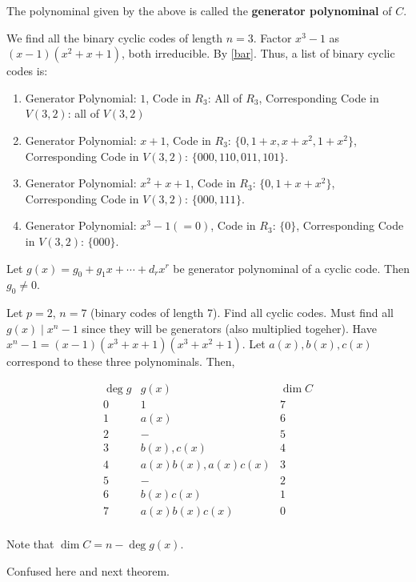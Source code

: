 \documentclass{article}
\begin{document}
\begin{definition}
  The polynominal given by the above is called the \textbf{generator
  polynominal} of \( C \).
\end{definition}
\begin{example}
  We find all the binary cyclic codes of length \( n=3 \). Factor \( x^3-1 \) as \( (x-1)(x^2+x+1) \), both irreducible. By \autoref{bar}. Thus, a list of binary cyclic codes is:
  \begin{enumerate}
    \item Generator Polynomial: \( 1 \), Code in  \( R_3 \): All of \( R_3 \), Corresponding Code in \( V(3, 2) \): all of \( V(3, 2) \)
    \item Generator Polynomial: \( x+1 \), Code in \( R_3 \): \( \{0, 1+x, x+x^2, 1+x^2 \}\), Corresponding Code in \( V(3, 2) \): \( \{000, 110, 011, 101\} \).
    \item Generator Polynomial: \( x^2+x+1 \), Code in \( R_3 \): \( \{0, 1+x+x^2\}\), Corresponding Code in \( V(3, 2) \): \( \{000, 111\} \).
    \item Generator Polynomial: \( x^3-1 (=0) \), Code in \( R_3 \): \( \{0\} \), Corresponding Code in \( V(3, 2) \): \( \{000\} \).
  \end{enumerate}
\end{example}
\begin{lemma}
  Let \( g(x) = g_0 + g_1x + \cdots + d_rx^r \) be generator
  polynominal of a cyclic code. Then \( g_0 \neq 0 \).
\end{lemma}
\begin{example}
  Let \( p=2 \), \( n=7 \) (binary codes of length 7). Find all cyclic codes. Must find all \( g(x) \mid x^n-1 \) since they will be generators (also multiplied togeher). Have \( x^n-1 = (x-1)(x^3+x+1)(x^3+x^2+1) \). Let \( a(x), b(x), c(x) \) correspond to these three polynominals. Then,
  \begin{center}
    \[
      \begin{array}{ c|c|c }
        \deg g & g(x) & \dim C \\
        \hline
        \hline
        0 & 1 & 7 \\
        1 & a(x) & 6\\
        2 & - & 5\\
        3 & b(x), c(x) & 4\\
        4 & a(x)b(x), a(x)c(x) & 3\\
        5 & - & 2\\
        6 & b(x)c(x) & 1\\
        7 & a(x)b(x)c(x) & 0\\
      \end{array}
    \]
  \end{center}

  Note that \( \dim C = n - \deg g(x) \).

  Confused here and next theorem.
\end{example}
\end{document}
